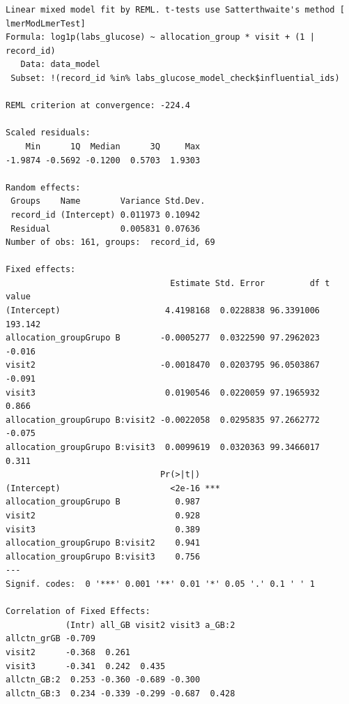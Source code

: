 \documentclass[
  letterpaper,
  DIV=11,
  numbers=noendperiod]{scrartcl}
\newenvironment{Shaded}{\begin{snugshade}}{\end{snugshade}}
\newcommand{\NormalTok}[1]{\textcolor[rgb]{0.00,0.23,0.31}{#1}}
\newcommand{\SpecialCharTok}[1]{\textcolor[rgb]{0.37,0.37,0.37}{#1}}
\begin{document}
\begin{verbatim}
Linear mixed model fit by REML. t-tests use Satterthwaite's method [
lmerModLmerTest]
Formula: log1p(labs_glucose) ~ allocation_group * visit + (1 | record_id)
   Data: data_model
 Subset: !(record_id %in% labs_glucose_model_check$influential_ids)

REML criterion at convergence: -224.4

Scaled residuals: 
    Min      1Q  Median      3Q     Max 
-1.9874 -0.5692 -0.1200  0.5703  1.9303 

Random effects:
 Groups    Name        Variance Std.Dev.
 record_id (Intercept) 0.011973 0.10942 
 Residual              0.005831 0.07636 
Number of obs: 161, groups:  record_id, 69

Fixed effects:
                                 Estimate Std. Error         df t value
(Intercept)                     4.4198168  0.0228838 96.3391006 193.142
allocation_groupGrupo B        -0.0005277  0.0322590 97.2962023  -0.016
visit2                         -0.0018470  0.0203795 96.0503867  -0.091
visit3                          0.0190546  0.0220059 97.1965932   0.866
allocation_groupGrupo B:visit2 -0.0022058  0.0295835 97.2662772  -0.075
allocation_groupGrupo B:visit3  0.0099619  0.0320363 99.3466017   0.311
                               Pr(>|t|)    
(Intercept)                      <2e-16 ***
allocation_groupGrupo B           0.987    
visit2                            0.928    
visit3                            0.389    
allocation_groupGrupo B:visit2    0.941    
allocation_groupGrupo B:visit3    0.756    
---
Signif. codes:  0 '***' 0.001 '**' 0.01 '*' 0.05 '.' 0.1 ' ' 1

Correlation of Fixed Effects:
            (Intr) all_GB visit2 visit3 a_GB:2
allctn_grGB -0.709                            
visit2      -0.368  0.261                     
visit3      -0.341  0.242  0.435              
allctn_GB:2  0.253 -0.360 -0.689 -0.300       
allctn_GB:3  0.234 -0.339 -0.299 -0.687  0.428
\end{verbatim}

\begin{Shaded}
\end{Shaded}
\end{document}
